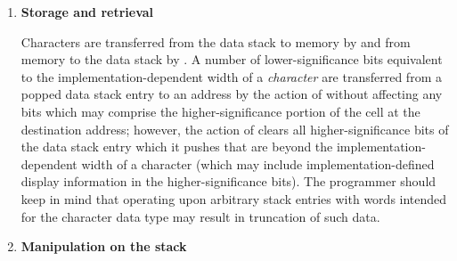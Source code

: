\begin{enumerate}
\begin{enumerate}
	\item A Standard Program can depend on the ability to receive
		any character in the range 32 {\ldots} 126 through ,
		and similarly to display the same set of characters with
		. If a program must be able to receive or display
		any particular character outside that range, it can declare
		an environmental dependency on the ability to receive or
		display that character.

	\item A Standard Program cannot use control characters in
		definition names. However, a Standard System is not required
		to enforce this prohibition. Thus, existing systems that
		currently allow control characters in words names from
		 source may continue to allow them, and
		programs running on those systems will continue to work. In
		text file source, the parsing action with space as a
		delimiter (e.g.,  ) treats control
		characters the same as spaces. This effectively implies that
		you cannot use control characters in definition names from
		text-file source, since the text interpreter will treat the
		control characters as delimiters. Note that this
		``control-character folding'' applies only when space is the
		delimiter, thus the phrase `` \texttt{)} ''
		may collect a string containing control characters.
	\end{enumerate}

\item \textbf{Storage and retrieval}

	Characters are transferred from the data stack to memory by
	 and from memory to the data stack by . A
	number of lower-significance bits equivalent to the
	implementation-dependent width of a \emph{character} are
	transferred from a popped data stack entry to an address by the
	action of  without affecting any bits which may comprise
	the higher-significance portion of the cell at the destination
	address; however, the action of  clears all
	higher-significance bits of the data stack entry which it pushes
	that are beyond the implementation-dependent width of a character
	(which may include implementation-defined display information in
	the higher-significance bits). The programmer should keep in mind
	that operating upon arbitrary stack entries with words intended
	for the character data type may result in truncation of such data.

\item \textbf{Manipulation on the stack}


\end{enumerate}
